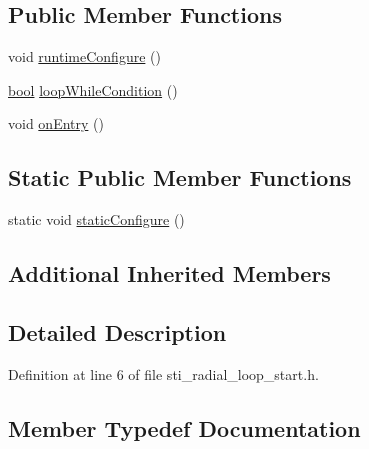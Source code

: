 \subsection*{Public Member Functions}
\begin{DoxyCompactItemize}
\item 
void \hyperlink{structsm__ridgeback__floor__coverage__dynamic__1_1_1radial__motion__states_1_1StiRadialLoopStart_a060b1f8aef3d8b45975091e973062f95}{runtime\+Configure} ()
\item 
\hyperlink{classbool}{bool} \hyperlink{structsm__ridgeback__floor__coverage__dynamic__1_1_1radial__motion__states_1_1StiRadialLoopStart_a4181a010973c9b49105b65d73805ccd2}{loop\+While\+Condition} ()
\item 
void \hyperlink{structsm__ridgeback__floor__coverage__dynamic__1_1_1radial__motion__states_1_1StiRadialLoopStart_a81bafd7024043822bde8fc63e382f813}{on\+Entry} ()
\end{DoxyCompactItemize}
\subsection*{Static Public Member Functions}
\begin{DoxyCompactItemize}
\item 
static void \hyperlink{structsm__ridgeback__floor__coverage__dynamic__1_1_1radial__motion__states_1_1StiRadialLoopStart_a4fa636b35714861c6eb8f439ce6d97cb}{static\+Configure} ()
\end{DoxyCompactItemize}
\subsection*{Additional Inherited Members}


\subsection{Detailed Description}


Definition at line 6 of file sti\+\_\+radial\+\_\+loop\+\_\+start.\+h.



\subsection{Member Typedef Documentation}
\mbox{\label{structsm__ridgeback__floor__coverage__dynamic__1_1_1radial__motion__states_1_1StiRadialLoopStart_addf4a71b8b7c86e0e764850cdeb252e7}} 

